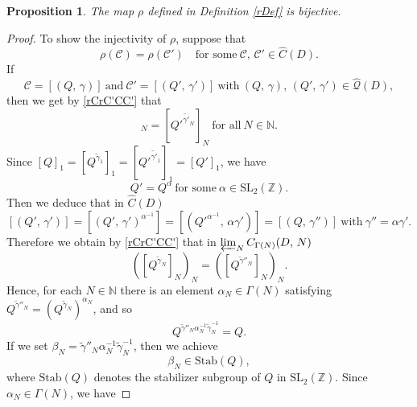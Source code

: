 \documentclass[reqno,11pt]{article}
\theoremstyle{plain} %
\newtheorem{proposition}[theorem]{\indent\sc Proposition}
\theoremstyle{definition} %
\begin{document}
\begin{proposition}\label{bijective}
The map $\rho$ defined in Definition \ref{rDef} is bijective. 
\end{proposition}
\begin{proof}
To show the injectivity of $\rho$, suppose that
\begin{equation}\label{rCrC'CC'}
\rho(\mathcal{C})=\rho(\mathcal{C}')
\quad\textrm{for some}~\mathcal{C},\,\mathcal{C}'\in\widehat{C}(D). 
\end{equation}
If
\begin{equation*}
\mathcal{C}=[(Q,\,\gamma)]~\text{and}~\mathcal{C}'=[(Q',\,\gamma')]~
\text{with}~(Q,\,\gamma),\,(Q',\,\gamma')\in\widehat{\mathcal{Q}}(D), 
\end{equation*}
then we get by \eqref{rCrC'CC'} that
\begin{equation*}
[Q^{\widetilde{\gamma}_N}]_N=
[Q'^{\widetilde{\gamma'}_N}]_N~\text{for all}~N\in\mathbb{N}. 
\end{equation*}
Since $[Q]_1=[Q^{\widetilde{\gamma}_1}]_1=[Q'^{\widetilde{\gamma'}_1}]_1=[Q']_1$,
we have
\begin{equation*}
Q'=Q^\alpha~\text{for some}~\alpha\in\mathrm{SL}_2(\mathbb{Z}). 
\end{equation*}
Then we deduce that in $\widehat{C}(D)$
\begin{equation}\label{QQQQ}
[(Q',\,\gamma')]=[(Q',\,\gamma')^{\alpha^{-1}}]=
[(Q'^{\alpha^{-1}},\,\alpha\gamma')]=
[(Q,\,\gamma'')]~\text{with}~\gamma''=\alpha\gamma'.
\end{equation}
Therefore we obtain by \eqref{rCrC'CC'} that in $\varprojlim_N C_{\Gamma(N)}(D,\,N)$
\begin{equation*}
([Q^{\widetilde{\gamma}_N}]_N)_N=
([Q^{\widetilde{\gamma}''_N}]_N)_N.
\end{equation*}
Hence, for each $N\in\mathbb{N}$ there is
an element $\alpha_N\in\Gamma(N)$ satisfying
$Q^{\widetilde{\gamma}''_N}=(Q^{\widetilde{\gamma}_N})^{\alpha_N}$, and so
\begin{equation*}
Q^{\widetilde{\gamma}''_N\alpha_N^{-1}\widetilde{\gamma}_N^{-1}}=Q. 
\end{equation*}
If we set $\beta_N=\widetilde{\gamma}''_N\alpha_N^{-1}\widetilde{\gamma}_N^{-1}$,
then we achieve
\begin{equation}\label{bS}
\beta_N\in\mathrm{Stab}(Q),
\end{equation}
where $\mathrm{Stab}(Q)$ denotes the stabilizer subgroup of $Q$ in $\mathrm{SL}_2(\mathbb{Z})$. 
Since $\alpha_N\in\Gamma(N)$, we have

\end{proof}
\end{document}
